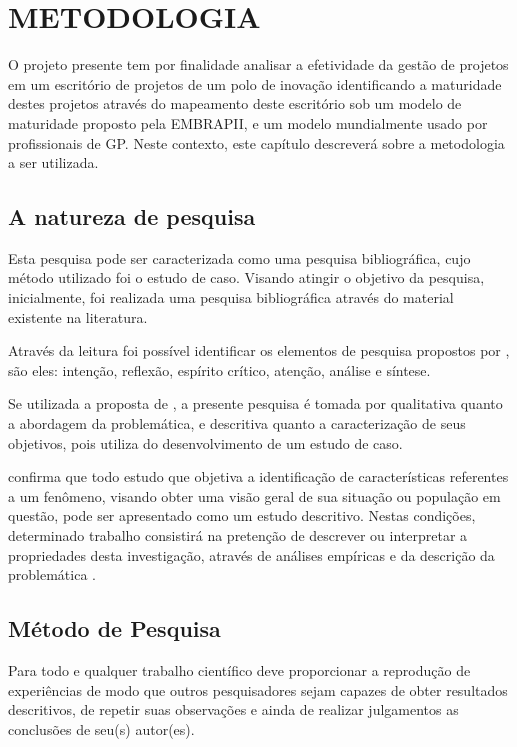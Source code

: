 \chapter{METODOLOGIA}
\thispagestyle{empty}

O projeto presente tem por finalidade analisar a efetividade da gestão de projetos em um escritório de projetos de um polo de inovação identificando a maturidade destes projetos através do mapeamento deste escritório sob um modelo de maturidade proposto pela EMBRAPII, e um modelo mundialmente usado por profissionais de GP. Neste contexto, este capítulo descreverá sobre a metodologia a ser utilizada.


\section{A natureza de pesquisa}

Esta pesquisa pode ser caracterizada como uma pesquisa bibliográfica, cujo método utilizado foi o estudo de caso. Visando atingir o objetivo da pesquisa, inicialmente, foi realizada uma pesquisa bibliográfica através do material existente na literatura.

Através da leitura foi possível identificar os elementos de pesquisa propostos por , são eles: intenção, reflexão, espírito crítico, atenção, análise e síntese.

Se utilizada a proposta de , a presente pesquisa é tomada por qualitativa quanto a abordagem da problemática, e descritiva quanto a caracterização de seus objetivos, pois utiliza do desenvolvimento de um estudo de caso.

 confirma que todo estudo que objetiva a identificação de características referentes a um fenômeno, visando obter uma visão geral de sua situação ou população em questão, pode ser apresentado como um estudo descritivo. Nestas condições, determinado trabalho consistirá na pretenção de descrever ou interpretar a propriedades desta investigação, através de análises empíricas e da descrição da problemática \cite{fortin2009fundamentos, lakatos2010fundamentos}.

\section{Método de Pesquisa}

Para  todo e qualquer trabalho científico deve proporcionar a reprodução de experiências de modo que outros pesquisadores sejam capazes de obter resultados descritivos, de repetir suas observações e ainda de realizar julgamentos as conclusões de seu(s) autor(es).


